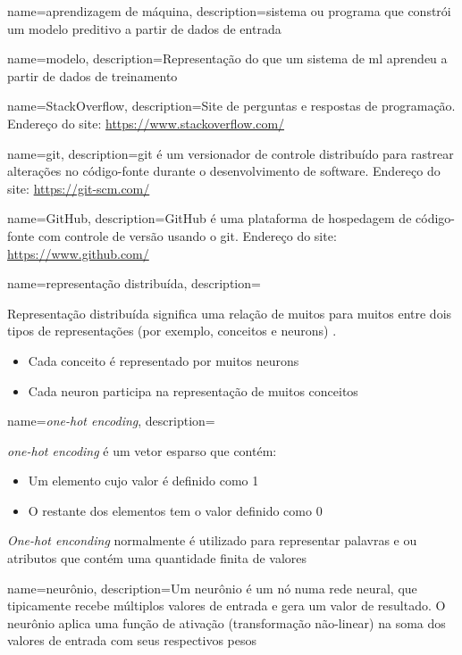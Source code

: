 {
    name=aprendizagem de máquina,
    description={sistema ou programa que constrói um modelo preditivo a partir de dados de entrada \citep{glossary-ml}}
}

{
    name=modelo,
    description={Representação do que um sistema de \gls{ml} aprendeu a partir de dados de treinamento \citep{glossary-ml}}
}

{
    name=StackOverflow,
    description={Site de perguntas e respostas de programação. Endereço do site: \url{https://www.stackoverflow.com/}}
}

{
    name=git,
    description={git é um versionador de controle distribuído para rastrear alterações no código-fonte durante o desenvolvimento de software. Endereço do site: \url{https://git-scm.com/} \citep{wikipedia-git-2019}}
}

{
    name=GitHub,
    description={GitHub é uma plataforma de hospedagem de código-fonte com controle de versão usando o \gls{git}. Endereço do site: \url{https://www.github.com/}}
}

{
    name=representação distribuída,
    description={Representação distribuída significa uma relação de muitos para muitos entre dois tipos de representações (por exemplo, conceitos e \gls{neuron}s) \citep{Hinton-distributed-representatons:1986}. 
    \begin{itemize}
        \item Cada conceito é representado por muitos \gls{neuron}s
        \item Cada \gls{neuron} participa na representação de muitos conceitos
    \end{itemize}
    }
}

{
    name=\textit{one-hot encoding},
    description={\textit{one-hot encoding} é um vetor esparso que contém:
    \begin{itemize}
        \item Um elemento cujo valor é definido como 1
        \item O restante dos elementos tem o valor definido como 0
    \end{itemize}
    \textit{One-hot enconding} normalmente é utilizado para representar palavras e ou atributos que contém uma quantidade finita de valores \citep{glossary-ml}
    }
}

{
    name=neurônio,
    description={Um neurônio é um nó numa rede neural, que tipicamente recebe múltiplos valores de entrada e gera um valor de resultado. O neurônio aplica uma função de ativação (transformação não-linear) na soma dos valores de entrada com seus respectivos pesos \citep{glossary-ml}}
}

